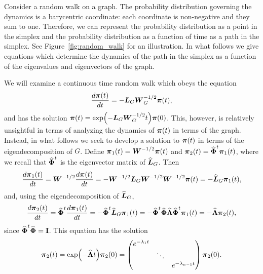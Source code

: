 Consider a  random walk on a graph. The probability distribution  governing the dynamics is a barycentric  coordinate: each coordinate is non-negative and they sum to one. Therefore, we can represent the probability distribution as a point in the simplex and the probability  distribution as a function of time as a path in the simplex. See Figure~\ref{fig:random_walk} for an illustration. In what follows we give equations which determine the dynamics of the path in the simplex as a function of the eigenvalues  and eigenvectors  of the graph. 

We will examine a continuous time random walk which  obeys the equation 
\begin{equation*}
\frac{d \boldsymbol{\pi}(t)}{dt } = -\vb*{L}_G\vb*{W}_G^{-1/2} \boldsymbol{\pi}(t),
\end{equation*}
and has the solution $\boldsymbol{\pi}(t)  = \exp(-\vb*{L}_G\vb*{W}_G^{-1/2}t)\boldsymbol{\pi}(0)$. This, however, is relatively unsightful in terms of  analyzing the dynamics of $\boldsymbol{\pi}(t)$ in terms of the  graph.  Instead, in  what follows we seek  to develop a solution to $\boldsymbol{\pi}(t)$ in terms of the  eigendecomposition of  $G$.  Define $\boldsymbol{\pi}_1(t) = \vb*{W}^{-1/2}\boldsymbol{\pi}(t)$ and $\boldsymbol{\pi}_2(t) = \widehat{\boldsymbol{\Phi}}^t \boldsymbol{\pi}_1(t)$, where we recall that $\widehat{\boldsymbol{\Phi}}^t$ is the eigenvector matrix  of  $\widehat{\vb*{L}}_G$.  Then 
\begin{equation*}
\frac{d \boldsymbol{\pi}_1(t)}{dt} = \vb*{W}^{-1/2}\frac{d \boldsymbol{\pi}(t)}{dt} = -\vb*{W}^{-1/2}\vb*{L}_G\vb*{W}^{-1/2}\vb*{W}^{-1/2}\boldsymbol{\pi}(t) = - \widehat{\vb*{L}}_G\boldsymbol{\pi}_1(t),
\end{equation*}
and, using the eigendecomposition of $\widehat{\vb*{L}}_G$,   
\begin{equation*}
\frac{ d\boldsymbol{\pi}_2(t)}{dt} = \widehat{\boldsymbol{\Phi}}^t \frac{d\boldsymbol{\pi}_1(t)}{dt} = -\widehat{\boldsymbol{\Phi}}^t \widehat{\vb*{L}}_G \boldsymbol{\pi}_1(t) = -\widehat{\boldsymbol{\Phi}}^t \widehat{\boldsymbol{\Phi}}\widehat{\vb{\Lambda}}\widehat{\boldsymbol{\Phi}}^t \boldsymbol{\pi}_1(t) = -\widehat{\vb{\Lambda}}  \boldsymbol{\pi}_2(t),
\end{equation*}
since  $\widehat{\boldsymbol{\Phi}}^t\widehat{\boldsymbol{\Phi}}=\vb{I}$. This equation  has the solution 
\begin{equation*}
\boldsymbol{\pi}_2(t) = \exp(-\widehat{\vb{\Lambda}} t)\boldsymbol{\pi}_2(0) = \begin{pmatrix}
e^{-\lambda_1 t}  & &\\
& \ddots  & \\
&& e^{-\lambda_{n-1} t}
\end{pmatrix}  \boldsymbol{\pi}_2(0).
\end{equation*}

